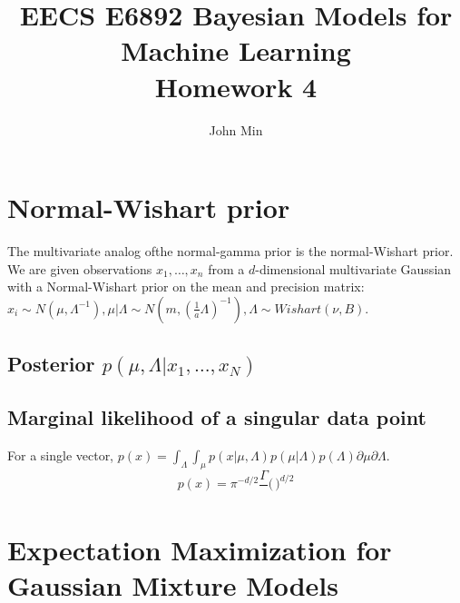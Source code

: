 \documentclass{article}
\author{John Min}
\title{EECS E6892 Bayesian Models for Machine Learning \\ Homework 4}
\begin{document}
\maketitle


\section{Normal-Wishart prior}

\noindent
The multivariate analog ofthe normal-gamma prior is the normal-Wishart prior. \\

\noindent
We are given observations $x_1, \ldots, x_n$ from a $d$-dimensional multivariate Gaussian with a Normal-Wishart prior on the mean and precision matrix:  $x_i \sim N(\mu, \Lambda^{-1}), \mu | \Lambda \sim N(m, (\frac{1}{a} \Lambda)^{-1}), \Lambda \sim Wishart(\nu, B).$  \\

\subsection{Posterior $p(\mu, \Lambda | x_1, \ldots, x_N)$}

\subsection{Marginal likelihood of a singular data point}
For a single vector, $p(x) = \int_\Lambda \int_\mu p(x|\mu, \Lambda) p(\mu|\Lambda) p(\Lambda) \partial \mu \partial \Lambda.$ \\

$$p(x) = \pi^{-d/2} \frac{\Gamma}{} \Bigg( \frac{}{} \Bigg )^{d/2}$$




\section{Expectation Maximization for Gaussian Mixture Models}
\end{document}
